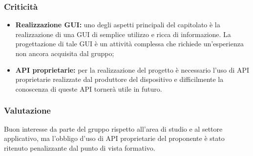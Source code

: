 \subsubsection{Criticità}
\begin{itemize}
\item \textbf{Realizzazione GUI:} uno degli aspetti principali del capitolato è la realizzazione di una GUI di semplice utilizzo e ricca di informazione. La progettazione di tale GUI è un attività complessa che richiede un'esperienza non ancora acquisita dal gruppo;
\item \textbf{API proprietarie:} per la realizzazione del progetto è necessario l'uso di API proprietarie realizzate dal produttore del dispositivo e difficilmente la conoscenza di queste API tornerà utile in futuro.
\end{itemize}
 
\subsubsection{Valutazione}
Buon interesse da parte del gruppo rispetto all'area di studio e al settore applicativo, ma l'obbligo d'uso di API proprietarie del proponente è stato ritenuto penalizzante dal punto di vista formativo.
